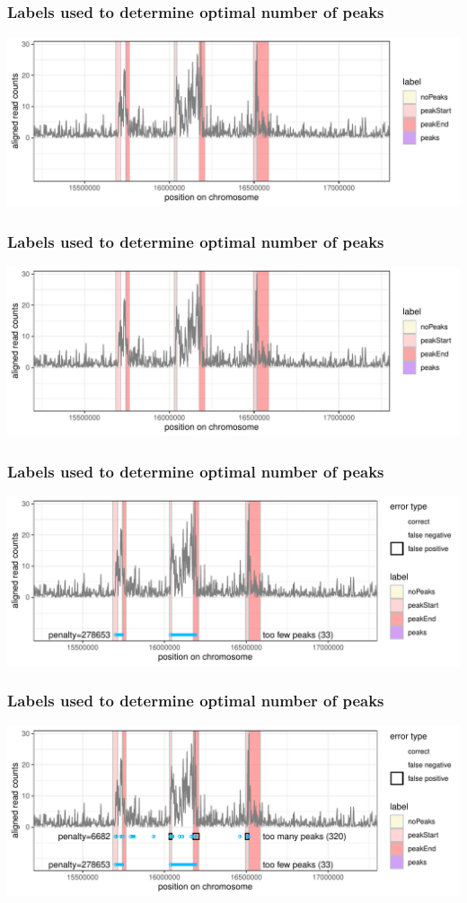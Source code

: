 \documentclass{beamer}
\begin{document}
\begin{frame}
  \frametitle{Labels used to determine optimal number of peaks}
  \includegraphics[width=\textwidth]{jss-figure-label-error-data-labels}
\end{frame}

\begin{frame}
  \frametitle{Labels used to determine optimal number of peaks}
  \includegraphics[width=\textwidth]{jss-figure-label-error-data-labels}
\end{frame}

\begin{frame}
  \frametitle{Labels used to determine optimal number of peaks}
  \includegraphics[width=\textwidth]{jss-figure-label-error-too-few}
\end{frame}

\begin{frame}
  \frametitle{Labels used to determine optimal number of peaks}
  \includegraphics[width=\textwidth]{jss-figure-label-error-too-many}
\end{frame}
\end{document}
